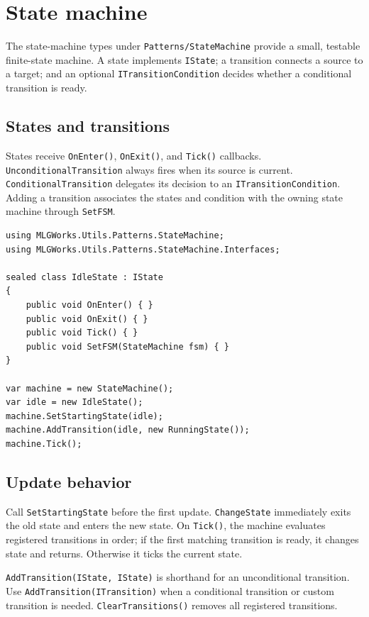 \section{State machine}
\label{sec:state-machine}

The state-machine types under \texttt{Patterns/StateMachine} provide a small, testable finite-state machine. A state implements \texttt{IState}; a transition connects a source to a target; and an optional \texttt{ITransitionCondition} decides whether a conditional transition is ready.

\subsection{States and transitions}
States receive \texttt{OnEnter()}, \texttt{OnExit()}, and \texttt{Tick()} callbacks. \texttt{UnconditionalTransition} always fires when its source is current. \texttt{ConditionalTransition} delegates its decision to an \texttt{ITransitionCondition}. Adding a transition associates the states and condition with the owning state machine through \texttt{SetFSM}.

\begin{lstlisting}
using MLGWorks.Utils.Patterns.StateMachine;
using MLGWorks.Utils.Patterns.StateMachine.Interfaces;

sealed class IdleState : IState
{
    public void OnEnter() { }
    public void OnExit() { }
    public void Tick() { }
    public void SetFSM(StateMachine fsm) { }
}

var machine = new StateMachine();
var idle = new IdleState();
machine.SetStartingState(idle);
machine.AddTransition(idle, new RunningState());
machine.Tick();
\end{lstlisting}

\subsection{Update behavior}
Call \texttt{SetStartingState} before the first update. \texttt{ChangeState} immediately exits the old state and enters the new state. On \texttt{Tick()}, the machine evaluates registered transitions in order; if the first matching transition is ready, it changes state and returns. Otherwise it ticks the current state.

\texttt{AddTransition(IState, IState)} is shorthand for an unconditional transition. Use \texttt{AddTransition(ITransition)} when a conditional transition or custom transition is needed. \texttt{ClearTransitions()} removes all registered transitions.
